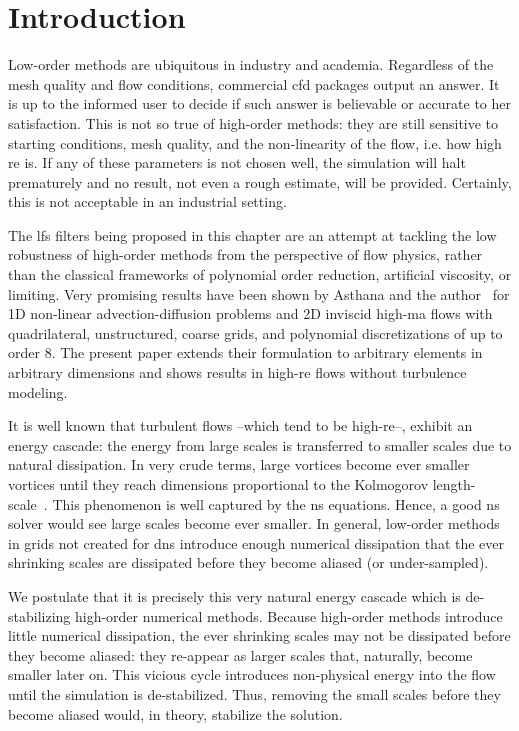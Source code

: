 \section{Introduction}
Low-order methods are ubiquitous in industry and academia. Regardless of the mesh quality and flow conditions, commercial \gls{cfd} packages output an answer. It is up to the informed user to decide if such answer is believable or accurate to her satisfaction. This is not so true of high-order methods: they are still sensitive to starting conditions, mesh quality, and the non-linearity of the flow, i.e. how high \gls{re} is. If any of these parameters is not chosen well, the simulation will halt prematurely and no result, not even a rough estimate, will be provided. Certainly, this is not acceptable in an industrial setting.

The \gls{lfs} filters being proposed in this chapter are an attempt at tackling the low robustness of high-order methods from the perspective of flow physics, rather than the classical frameworks of polynomial order reduction, artificial viscosity, or limiting. Very promising results have been shown by Asthana and the author~\cite{asthana2014} for 1D non-linear advection-diffusion problems and 2D inviscid high-\gls{ma} flows with quadrilateral, unstructured, coarse grids, and polynomial discretizations of up to order $8$. The present paper extends their formulation to arbitrary elements in arbitrary dimensions and shows results in high-\gls{re} flows without turbulence modeling.

It is well known that turbulent flows --which tend to be high-\gls{re}--, exhibit an energy cascade: the energy from large scales is transferred to smaller scales due to natural dissipation. In very crude terms, large vortices become ever smaller vortices until they reach dimensions proportional to the Kolmogorov length-scale~\cite{kolmogorov1962refinement}. This phenomenon is well captured by the \gls{ns} equations. Hence, a good \gls{ns} solver would see large scales become ever smaller. In general, low-order methods in grids not created for \gls{dns} introduce enough numerical dissipation that the ever shrinking scales are dissipated before they become aliased (or under-sampled).

We postulate that it is precisely this very natural energy cascade which is de-stabilizing high-order numerical methods. Because high-order methods introduce little numerical dissipation, the ever shrinking scales may not be dissipated before they become aliased: they re-appear as larger scales that, naturally, become smaller later on. This vicious cycle introduces non-physical energy into the flow until the simulation is de-stabilized. Thus, removing the small scales before they become aliased would, in theory, stabilize the solution.

